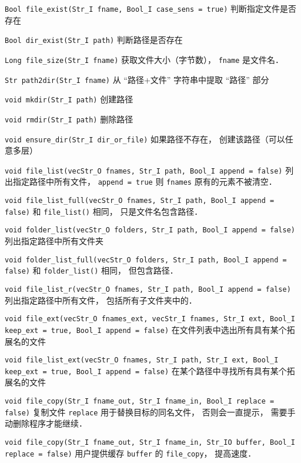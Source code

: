 
\begin{issues}
\issueDraft
\end{issues}

\verb|Bool file_exist(Str_I fname, Bool_I case_sens = true)| 判断指定文件是否存在

\verb|Bool dir_exist(Str_I path)| 判断路径是否存在

\verb|Long file_size(Str_I fname)| 获取文件大小（字节数）， \verb|fname| 是文件名．

\verb|Str path2dir(Str_I fname)| 从 “路径+文件” 字符串中提取 “路径” 部分

\verb|void mkdir(Str_I path)| 创建路径

\verb|void rmdir(Str_I path)| 删除路径

\verb|void ensure_dir(Str_I dir_or_file)| 如果路径不存在， 创建该路径（可以任意多层）

\verb|void file_list(vecStr_O fnames, Str_I path, Bool_I append = false)| 列出指定路径中所有文件， \verb|append = true| 则 \verb|fnames| 原有的元素不被清空．

\verb|void file_list_full(vecStr_O fnames, Str_I path, Bool_I append = false)| 和 \verb|file_list()| 相同， 只是文件名包含路径．

\verb|void folder_list(vecStr_O folders, Str_I path, Bool_I append = false)| 列出指定路径中所有文件夹

\verb|void folder_list_full(vecStr_O folders, Str_I path, Bool_I append = false)| 和 \verb|folder_list()| 相同， 但包含路径．

\verb|void file_list_r(vecStr_O fnames, Str_I path, Bool_I append = false)| 列出指定路径中所有文件， 包括所有子文件夹中的．

\verb|void file_ext(vecStr_O fnames_ext, vecStr_I fnames, Str_I ext, Bool_I keep_ext = true, Bool_I append = false)| 在文件列表中选出所有具有某个拓展名的文件

\verb|void file_list_ext(vecStr_O fnames, Str_I path, Str_I ext, Bool_I keep_ext = true, Bool_I append = false)| 在某个路径中寻找所有具有某个拓展名的文件

\verb|void file_copy(Str_I fname_out, Str_I fname_in, Bool_I replace = false)| 复制文件 \verb|replace| 用于替换目标的同名文件， 否则会一直提示， 需要手动删除程序才能继续．

\verb|void file_copy(Str_I fname_out, Str_I fname_in, Str_IO buffer, Bool_I replace = false)| 用户提供缓存 \verb|buffer| 的 \verb|file_copy|， 提高速度．

